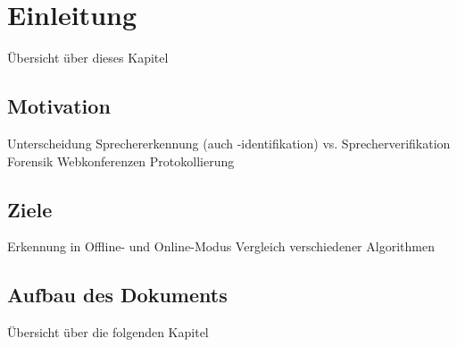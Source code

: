 \chapter{Einleitung}
Übersicht über dieses Kapitel

\section{Motivation}
Unterscheidung Sprechererkennung (auch -identifikation) vs. Sprecherverifikation
Forensik
Webkonferenzen
Protokollierung

\section{Ziele}
Erkennung in Offline- und Online-Modus
Vergleich verschiedener Algorithmen

\section{Aufbau des Dokuments}
Übersicht über die folgenden Kapitel
